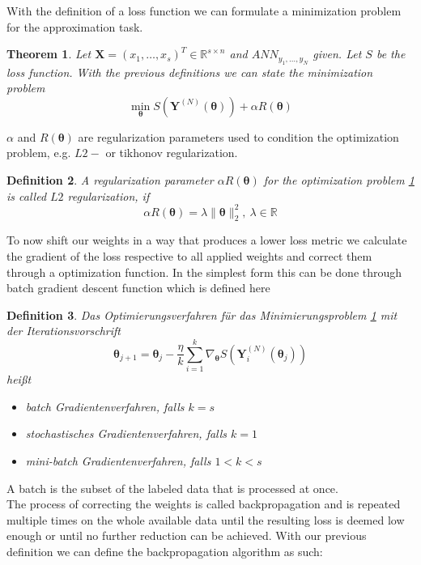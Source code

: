 \documentclass[a4paper,12pt,titlepage,enabledeprecatedfontcommands]{scrreprt}
\newtheorem{definition}{Definition}[chapter]
\newtheorem{theorem}[definition]{Theorem}
\begin{document}
With the definition of a loss function we can formulate a minimization problem for the approximation task.	
\begin{theorem} \label{minimizationProblem}
Let $\bm{X}=(x_1,\ldots,x_s)^T \in \mathbb{R}^{s \times n}$ and $ANN_{y_1,\ldots,y_N}$ given. Let $S$ be the loss function. With the previous definitions we can state the minimization problem
\begin{equation}
\min_{\bm{\theta}} S(\bm{Y}^{(N)}(\bm{\theta})) + \alpha R(\bm{\theta})
\end{equation}
\end{theorem}
$\alpha$ and $R(\bm{\theta})$ are regularization parameters used to condition the optimization problem, e.g. $L2-$ or tikhonov regularization.
\begin{definition}
A regularization parameter $\alpha R(\bm{\theta})$ for the optimization problem \ref{minimizationProblem}
is called $L2$ regularization, if
\begin{equation}
\alpha R(\bm{\theta}) = \lambda \parallel \bm{\theta} \parallel_2^2 , \ \lambda \in \mathbb{R}
\end{equation}
\end{definition}
To now shift our weights in a way that produces a lower loss metric we calculate the gradient of the loss respective to all applied weights and correct them through a optimization function. In the simplest form this can be done through batch gradient descent function which is defined here \\
\begin{definition}
Das Optimierungsverfahren für das Minimierungsproblem \ref{minimizationProblem} mit der Iterationsvorschrift 
\begin{equation}
\bm{\theta}_{j+1} = \bm{\theta}_j - \frac{\eta}{k} \sum_{i=1}^{k} \nabla_{\bm{\theta}} S(\bm{Y}^{(N)}_{i}(\bm{\theta}_j))
\end{equation}
heißt 
\begin{itemize}
\item batch Gradientenverfahren, falls $k=s$
\item stochastisches Gradientenverfahren, falls $k=1$
\item mini-batch Gradientenverfahren, falls $1<k<s$
\end{itemize}
\end{definition}
A batch is the subset of the labeled data that is processed at once. \\
The process of correcting the weights is called backpropagation and is repeated multiple times on the whole available data until the resulting loss is deemed low enough or until no further reduction can be achieved. With our previous definition we can define the backpropagation algorithm as such: \\
\end{document}
